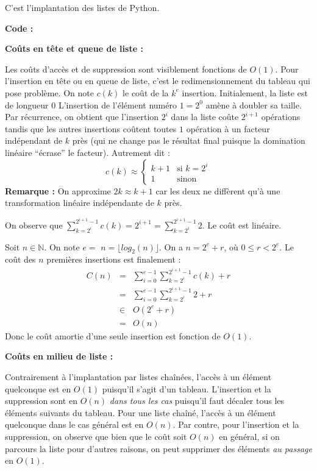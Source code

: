 \documentclass[../main.tex]{subfiles}
\begin{document}
 C'est l'implantation des listes de Python.

\textbf{Code :} 

\textbf{Coûts en tête et queue de liste :}

Les coûts d'accès et de suppression sont visiblement fonctions de $O(1)$. Pour l'insertion en tête ou en queue de liste, c'est le redimensionnement du tableau qui pose problème. On note $c(k)$ le coût de la $k^e$ insertion. Initialement, la liste est de longueur $0$ L'insertion de l'élément numéro $1 = 2^0$ amène à doubler sa taille. Par récurrence, on obtient que l'insertion $2^i$ dans la liste coûte $2^{i+1}$ opérations tandis que les autres insertions coûtent toutes $1$ opération à un facteur indépendant de $k$ près (qui ne change pas le résultat final puisque la domination linéaire ``écrase'' le facteur). Autrement dit :
$$c(k) \approx \left\{\begin{array}{ll}
k + 1 & \text{si } k = 2^i \\
1 & \text{sinon}
\end{array}\right.$$
\textbf{Remarque :} On approxime $2k\approx k + 1$ car les deux ne diffèrent qu'à une transformation linéaire indépendante de $k$ près.

On observe que $\sum_{k = 2^i}^{2^{i+1} - 1}c(k) = 2^{i+1} = \sum_{k = 2^i}^{2^{i+1} - 1}2$. Le coût est linéaire.

Soit $n\in\mathbb{N}$. On note $e = $ $n = \lfloor{log_2(n)}\rfloor$. On a $n = 2^e + r$, où $0\leq r < 2^e$. Le coût des $n$ premières insertions est finalement :
$$\begin{array}{lcl}
C(n) & = & \displaystyle\sum_{i = 0}^{e - 1}\sum_{k = 2^i}^{2^{i+1}-1}c(k) + r \\
 & = & \displaystyle\sum_{i = 0}^{e - 1}\sum_{k = 2^i}^{2^{i+1} - 1}2 + r \\
 & \in & O(2^e + r) \\
 & = & O(n)
 \end{array}$$
 Donc le coût amortie d'une seule insertion est fonction de $O(1)$.

 \textbf{Coûts en milieu de liste :}

 Contrairement à l'implantation par listes chaînées, l'accès à un élément quelconque est en $O(1)$ puisqu'il s'agit d'un tableau. L'insertion et la suppression sont en $O(n)$ \textit{dans tous les cas} puisqu'il faut décaler tous les éléments suivants du tableau. Pour une liste chaîné, l'accès à un élément quelconque dans le cas général est en $O(n)$. Par contre, pour l'insertion et la suppression, on observe que bien que le coût soit $O(n)$ en général, si on parcours la liste pour d'autres raisons, on peut supprimer des éléments \textit{au passage} en $O(1)$.
\end{document}
